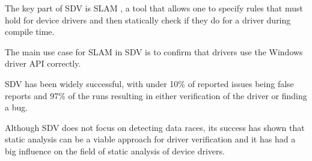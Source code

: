 \documentclass[..thesis.tex]{subfiles}
\begin{document}
The key part of SDV is SLAM \cite{ball_decade_2011}, a tool that allows one to specify rules that must hold for device drivers and
then statically check if they do for a driver during compile time. 

The main use case for SLAM in SDV is to confirm that drivers use the Windows driver API correctly.
 
SDV has been widely successful, with under 10\%  of reported issues being false reports \cite[74]{ball_decade_2011} and
97\% of the runs resulting in either verification of the driver or finding a bug.

Although SDV does not focus on detecting data races, its success has shown that static analysis can be a viable approach for driver verification and it
has had a big influence on the field of static analysis of device drivers.
\end{document}
